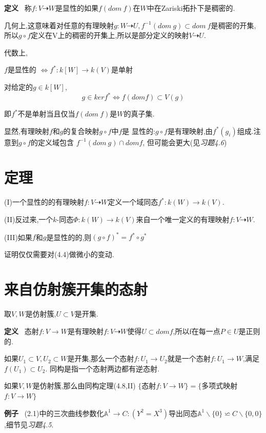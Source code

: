 \documentclass[UTF8]{book}
\begin{document}
		\textbf{定义} \ 称$f:V \dashrightarrow W$是显性的如果$ f(dom \ f) $在$ W $中在Zariski拓扑下是稠密的.

		几何上,这意味着对任意的有理映射$g:W\dashrightarrow U,  f^{-1}(dom \ g)\subset dom \ f$是稠密的开集,所以$g\circ f$定义在V上的稠密的开集上,所以是部分定义的映射$V\dashrightarrow U$.

		代数上,

		\center  $ f $是显性的 $\iff f^{*}:k[W]\rightarrow k(V)$是单射

		\justifying
		对给定的$g\in k[W]$,
		\begin{equation*}
		g\in ker f^{*} \iff f(dom f)\subset V(g)
		\end{equation*}

		即$f^{*}$不是单射当且仅当$ f(dom \ f) $是$ W $的真子集.

		显然,有理映射$ f $和$ g $的复合映射$g\circ f$中$ f$是 显性的:$g\circ f$是有理映射,由$f^{*}(g_{i})$组成.注意到$g\circ f$的定义域包含 $f^{-1}(dom \ g)\cap dom f$, 但可能会更大(见\textit{习题4.6})
	\section{定理}
		(I)一个显性的的有理映射$f:V\dashrightarrow W$定义一个域同态$f^{*}:k(W)\rightarrow k(V)$.

		(II)反过来,一个$ k $-同态$\Phi: k(W)\rightarrow k(V)$来自一个唯一定义的有理映射$f:V\dashrightarrow W$.

		(III)如果$ f $和$ g $是显性的的,则$(g\circ f)^{*}=f^{*}\circ g^{*}$

		证明仅仅需要对(4.4)做微小的变动.

	\section{来自仿射簇开集的态射}
		取$ V,W $是仿射簇,$U\subset V$是开集.

		\textbf{定义} \ 态射$f:V\rightarrow W$是有理映射$f:V\dashrightarrow W$使得$U\subset dom f$,所以f在每一点$P\in U$是正则的.

		如果$U_{1}\subset V,U_{2}\subset W$是开集,那么一个态射$f:U_{1}\rightarrow U_{2}$就是一个态射$f:U_{1}\rightarrow W$,满足$f(U_{1})\subset U_{2}$. 同构是指一个态射两边都有逆态射.

		如果$ V,W $是仿射簇,那么由同构定理(4.8,II)
		\center  $\{$态射$f:V\rightarrow W\}=\{$多项式映射$f:V\rightarrow W\}$


		\justifying
		\textbf{例子} \ (2.1)中的三次曲线参数化$\mathbb{A}^{1} \rightarrow C:(Y^{2}=X^{3}) $导出同态$\mathbb{A}^{1}\backslash \{0\}\backsimeq C\backslash \{0,0\}$,细节见\textit{习题4.5}.
\end{document}
